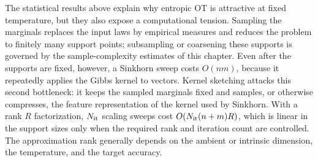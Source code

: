 The statistical results above explain why entropic OT is attractive at fixed temperature, but they also expose a computational tension. Sampling the marginals replaces the input laws by empirical measures and reduces the problem to finitely many support points; subsampling or coarsening these supports is governed by the sample-complexity estimates of this chapter. Even after the supports are fixed, however, a Sinkhorn sweep costs \(O(nm)\), because it repeatedly applies the Gibbs kernel to vectors. Kernel sketching attacks this second bottleneck: it keeps the sampled marginals fixed and samples, or otherwise compresses, the feature representation of the kernel used by Sinkhorn. With a rank \(R\) factorization, \(N_{\rm it}\) scaling sweeps cost \(O(N_{\rm it}(n+m)R)\), which is linear in the support sizes only when the required rank and iteration count are controlled. The approximation rank generally depends on the ambient or intrinsic dimension, the temperature, and the target accuracy.

